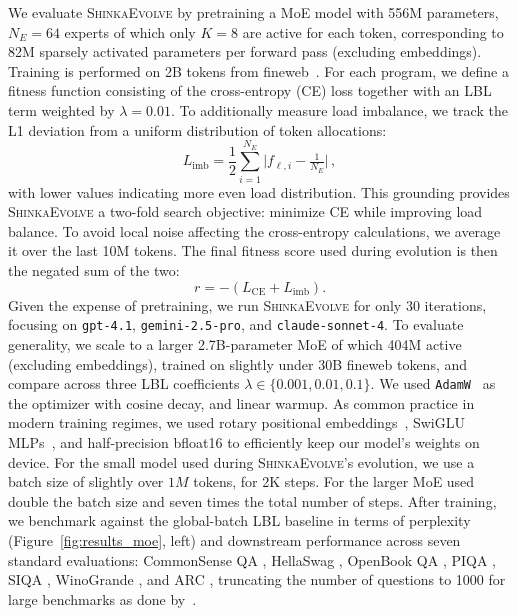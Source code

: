 \documentclass[11pt, a4paper]{include/gdm_format}
\newcommand{\ouralgo}{\textsc{ShinkaEvolve}\xspace}
\begin{document}
{We evaluate \ouralgo by pretraining a MoE model with 556M parameters, $N_E=64$ experts of which only $K=8$ are active for each token, corresponding to 82M sparsely activated parameters per forward pass (excluding embeddings). Training is performed on 2B tokens from fineweb~\citep{fineweb}. For each program, we define a fitness function consisting of the cross-entropy (CE) loss together with an LBL term weighted by $\lambda=0.01$. To additionally measure load imbalance, we track the L1 deviation from a uniform distribution of token allocations:
\begin{equation}
\label{eq:moe_load_imbalance_extended}
L_{\mathrm{imb}}
= \frac{1}{2}\sum_{i=1}^{N_E} \bigl|f_{\ell,i}- \tfrac{1}{N_E}\bigr| \, ,
\end{equation}
with lower values indicating more even load distribution. This grounding provides \ouralgo a two-fold search objective: minimize CE while improving load balance. To avoid local noise affecting the cross-entropy calculations, we average it over the last 10M tokens. The final fitness score used during evolution is then the negated sum of the two:
\begin{equation}
\label{eq:moe_ce_imb_tradeoff}
r= -(L_\mathrm{CE}
+ L_{\mathrm{imb}}).
\end{equation}
Given the expense of pretraining, we run \ouralgo for only 30 iterations, focusing on \texttt{gpt-4.1}, \texttt{gemini-2.5-pro}, and \texttt{claude-sonnet-4}. To evaluate generality, we scale to a larger 2.7B-parameter MoE of which 404M active (excluding embeddings), trained on slightly under 30B fineweb tokens, and compare across three LBL coefficients $\lambda \in \{0.001, 0.01, 0.1\}$. We used \texttt{AdamW}~\citep{adamw} as the optimizer with cosine decay, and linear warmup. As common practice in modern training regimes, we used rotary positional embeddings~\citep{rope}, SwiGLU MLPs~\citep{swiglu}, and half-precision bfloat16 to efficiently keep our model's weights on device. For the small model used during \ouralgo's evolution, we use a batch size of slightly over $1M$ tokens, for 2K steps. For the larger MoE used double the batch size and seven times the total number of steps. After training, we benchmark against the global-batch LBL baseline in terms of perplexity (Figure~\ref{fig:results_moe}, left) and downstream performance across seven standard evaluations: CommonSense QA \citep{moe_bench_1_commonsenseqa}, HellaSwag \citep{moe_bench_2_hellaswag}, OpenBook QA \citep{moe_bench_3_openbook_qa}, PIQA \citep{moe_bench_4_piqa}, SIQA \citep{moe_bench_5_siqa}, 
WinoGrande \citep{moe_bench_6_winogrande}, and ARC \citep{moe_bench_7_arc}, truncating the number of questions to 1000 for large benchmarks as done by~\citep{fineweb}.

}
\end{document}
